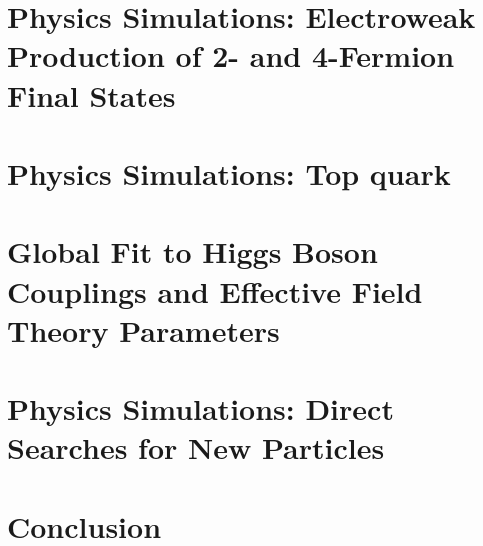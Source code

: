 \documentclass[%
reprint,
nofootinbib,
 amsmath,amssymb,
 aps,
]{revtex4-1}
\begin{document}
\section{\label{sec:ew}Physics Simulations: Electroweak Production of 2- and 4-Fermion Final States }



  
  



\section{\label{sec:top}Physics Simulations: Top quark}

  
  




 
  
%  


\section{\label{sec:global}Global Fit to Higgs Boson Couplings and Effective Field Theory Parameters}

  



\section{\label{sec:searches}Physics Simulations: Direct Searches for
  New Particles}


 
  
 

\section{\label{sec:conclusion}Conclusion}




%

\end{document}

